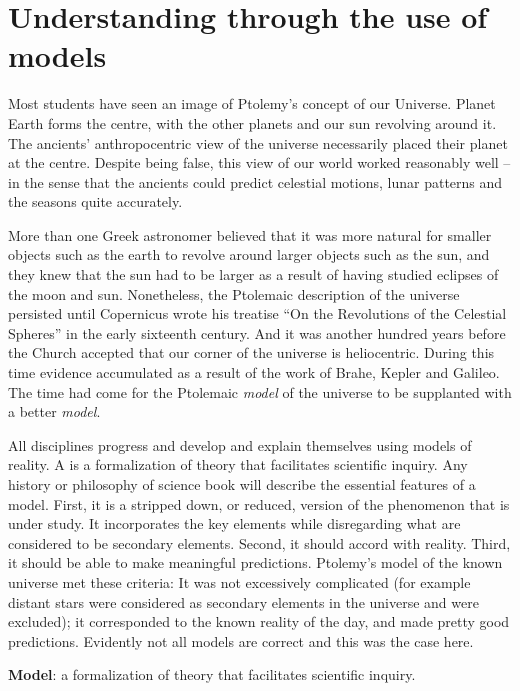 \section{Understanding through the use of models}\label{sec:ch1sec2}

Most students have seen an image of Ptolemy's concept of our Universe.
Planet Earth forms the centre, with the other planets and our sun revolving
around it. The ancients' anthropocentric view of the universe necessarily
placed their planet at the centre. Despite being false, this view of our
world worked reasonably well -- in the sense that the ancients could predict
celestial motions, lunar patterns and the seasons quite accurately.

More than one Greek astronomer believed that it was more natural for smaller
objects such as the earth to revolve around larger objects such as the sun,
and they knew that the sun had to be larger as a result of having studied
eclipses of the moon and sun. Nonetheless, the Ptolemaic description of the
universe persisted until Copernicus wrote his treatise ``On the Revolutions
of the Celestial Spheres'' in the early sixteenth century. And it was
another hundred years before the Church accepted that our corner of the
universe is heliocentric. During this time evidence accumulated as a result
of the work of Brahe, Kepler and Galileo. The time had come for the
Ptolemaic \textit{model} of the universe to be supplanted with a better 
\textit{model}.

All disciplines progress and develop and explain themselves using models of
reality. A  is a formalization of theory that facilitates
scientific inquiry. Any history or philosophy of science book will describe
the essential features of a model. First, it is a stripped down, or reduced,
version of the phenomenon that is under study. It incorporates the key
elements while disregarding what are considered to be secondary elements.
Second, it should accord with reality. Third, it should be able to make
meaningful predictions. Ptolemy's model of the known universe met these
criteria: It was not excessively complicated (for example distant stars were
considered as secondary elements in the universe and were excluded); it
corresponded to the known reality of the day, and made pretty good
predictions. Evidently not all models are correct and this was the case here.

\begin{DefBox}
	\textbf{Model}: a formalization of theory that facilitates scientific inquiry.
\end{DefBox}

